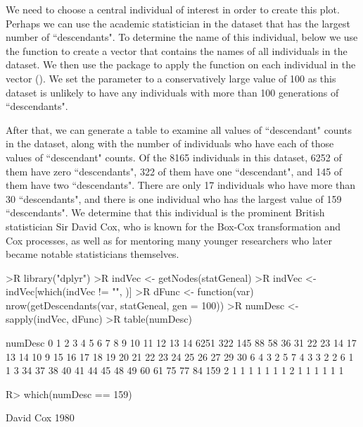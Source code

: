 \documentclass[article,shortnames]{jss}
\begin{document}
We need to choose a central individual of interest in order to create this plot. Perhaps we can use the academic statistician in the dataset that has the largest number of ``descendants". To determine the name of this individual, below we use the  function  to create a vector  that contains the names of all individuals in the dataset. We then use the  package to apply the  function  on each individual in the  vector (\citealt{dplyr}). We set the parameter  to a conservatively large value of 100 as this dataset is unlikely to have any individuals with more than 100 generations of ``descendants".

After that, we can generate a table to examine all values of ``descendant" counts in the dataset, along with the number of individuals who have each of those values of ``descendant" counts. Of the 8165 individuals in this dataset, 6252 of them have zero ``descendants", 322 of them have one ``descendant", and 145 of them have two ``descendants". There are only 17 individuals who have more than 30 ``descendants", and there is one individual who has the largest value of 159 ``descendants". We determine that this individual is the prominent British statistician Sir David Cox, who is known for the Box-Cox transformation and Cox processes, as well as for mentoring many younger researchers who later became notable statisticians themselves.

\begin{CodeChunk}
\begin{CodeInput}
>R library("dplyr")
>R indVec <- getNodes(statGeneal)
>R indVec <- indVec[which(indVec != "", )]
>R dFunc <- function(var) nrow(getDescendants(var, statGeneal, gen = 100))
>R numDesc <- sapply(indVec, dFunc)
>R table(numDesc)
\end{CodeInput}
\begin{CodeOutput}
numDesc
   0    1    2    3    4    5    6    7    8    9   10   11   12   13   14 
6251  322  145   88   58   36   31   22   23   14   17   13   14   10    9 
  15   16   17   18   19   20   21   22   23   24   25   26   27   29   30 
   6    4    3    2    5    7    4    3    3    2    2    6    1    1    3 
  34   37   38   40   41   44   45   48   49   60   61   75   77   84  159 
   2    1    1    1    1    1    1    1    2    1    1    1    1    1    1 
\end{CodeOutput}
\begin{CodeInput}
R> which(numDesc == 159)
\end{CodeInput}
\begin{CodeOutput}
David Cox 
     1980
\end{CodeOutput}
\end{CodeChunk}
\end{document}
